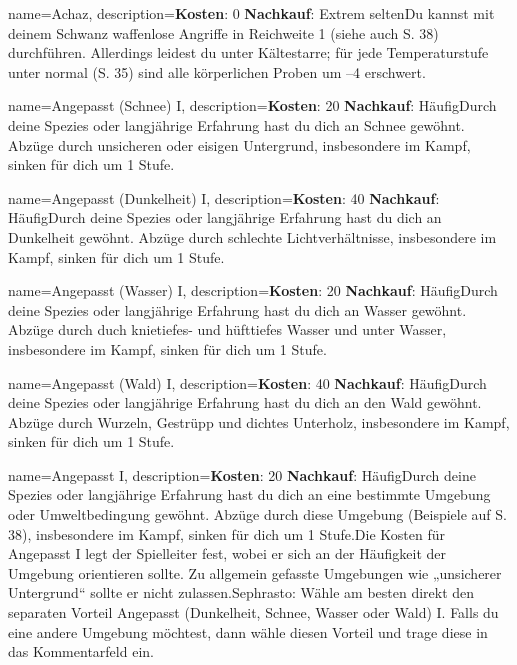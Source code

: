 
{
    name={Achaz},
    description={\textbf{Kosten}: 0 \textbf{Nachkauf}: Extrem selten\newline Du kannst mit deinem Schwanz waffenlose Angriffe in Reichweite 1 (siehe auch S. 38) durchführen. Allerdings leidest du unter Kältestarre; für jede Temperaturstufe unter normal (S. 35) sind alle körperlichen Proben um –4 erschwert.}
}


{
    name={Angepasst (Schnee) I},
    description={\textbf{Kosten}: 20 \textbf{Nachkauf}: Häufig\newline Durch deine Spezies oder langjährige Erfahrung hast du dich an Schnee gewöhnt. Abzüge durch unsicheren oder eisigen Untergrund, insbesondere im Kampf, sinken für dich um 1 Stufe.}
}


{
    name={Angepasst (Dunkelheit) I},
    description={\textbf{Kosten}: 40 \textbf{Nachkauf}: Häufig\newline Durch deine Spezies oder langjährige Erfahrung hast du dich an Dunkelheit gewöhnt. Abzüge durch schlechte Lichtverhältnisse, insbesondere im Kampf, sinken für dich um 1 Stufe.}
}


{
    name={Angepasst (Wasser) I},
    description={\textbf{Kosten}: 20 \textbf{Nachkauf}: Häufig\newline Durch deine Spezies oder langjährige Erfahrung hast du dich an Wasser gewöhnt. Abzüge durch duch knietiefes- und hüfttiefes Wasser und unter Wasser, insbesondere im Kampf, sinken für dich um 1 Stufe.}
}


{
    name={Angepasst (Wald) I},
    description={\textbf{Kosten}: 40 \textbf{Nachkauf}: Häufig\newline Durch deine Spezies oder langjährige Erfahrung hast du dich an den Wald gewöhnt. Abzüge durch Wurzeln, Gestrüpp und dichtes Unterholz, insbesondere im Kampf, sinken für dich um 1 Stufe.}
}


{
    name={Angepasst I},
    description={\textbf{Kosten}: 20 \textbf{Nachkauf}: Häufig\newline Durch deine Spezies oder langjährige Erfahrung hast du dich an eine bestimmte Umgebung oder Umweltbedingung gewöhnt. Abzüge durch diese Umgebung (Beispiele auf S. 38), insbesondere im Kampf, sinken für dich um 1 Stufe.\newline Die Kosten für Angepasst I legt der Spielleiter fest, wobei er sich an der Häufigkeit der Umgebung orientieren sollte. Zu allgemein gefasste Umgebungen wie „unsicherer Untergrund“ sollte er nicht zulassen.\newline Sephrasto: Wähle am besten direkt den separaten Vorteil Angepasst (Dunkelheit, Schnee, Wasser oder Wald) I. Falls du eine andere Umgebung möchtest, dann wähle diesen Vorteil und trage diese in das Kommentarfeld ein.}
}


